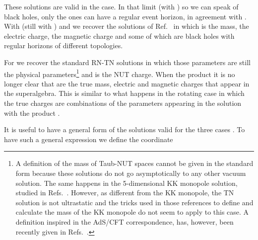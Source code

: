 \documentclass[12pt,a4paper]{article}
\begin{document}
These solutions are valid in the \coordHE{} case. In that limit (with \coordHE{})
so we can speak of black holes, only the \coordHE{} ones can have a
regular event horizon, in agreement with \cite{art:Haw7,art:FSW}.
With \coordHE{} (still with \coordHE{}) and we recover the solutions of
Ref.~\cite{art:BLP} in which \coordHE{} is the mass, \coordHE{} the electric charge,
\coordHE{} the magnetic charge and \coordHE{} some of which are black holes
with regular horizons of different topologies.

For \coordHE{} we recover the standard RN-TN solutions in which
those parameters are still the physical parameters\footnote{A
  definition of the mass of Taub-NUT spaces cannot be given in the
  standard form because these solutions do not go asymptotically to
  any other vacuum solution.  The same happens in the 5-dimensional KK
  monopole solution, studied in Refs.~\cite{kn:DS,kn:BKKLS}. However,
  as different from the KK monopole, the TN solution is not
  ultrastatic and the tricks used in those references to define and
  calculate the mass of the KK monopole do not seem to apply to this
  case. A definition inspired in the AdS/CFT correspondence, has,
  however, been recently given in Refs.~\cite{kn:Man3,kn:CEJM}.} and
\coordHE{} is the NUT charge. When the product \coordHE{} it is no longer
clear that \coordHE{} are the true mass, electric and magnetic charges
that appear in the superalgebra.  This is similar to what happens in
the rotating case \cite{art:KP} in which the true charges are
combinations of the parameters \coordHE{} appearing in the solution with
the product \coordHE{}.

It is useful to have a general form of the solutions valid for the
three cases \coordHE{}. To have such a general expression we
define the coordinate \coordHE{}
\end{document}
